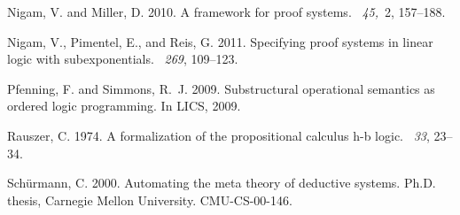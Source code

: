 \documentclass{new_tlp}
\begin{document}
\begin{thebibliography}{}
{\sc Nigam, V.} {\sc and} {\sc Miller, D.} 2010.
\newblock A framework for proof systems.
~{\em 45,\/}~2, 157--188.

{\sc Nigam, V.}, {\sc Pimentel, E.}, {\sc and} {\sc Reis, G.} 2011.
\newblock Specifying proof systems in linear logic with subexponentials.
~{\em 269}, 109--123.

{\sc Pfenning, F.} {\sc and} {\sc Simmons, R.~J.} 2009.
\newblock Substructural operational semantics as ordered logic programming.
\newblock In {LICS}, 2009.

{\sc Rauszer, C.} 1974.
\newblock A formalization of the propositional calculus h-b logic.
~{\em 33}, 23--34.

{\sc Sch{\"{u}}rmann, C.} 2000.
\newblock Automating the meta theory of deductive systems.
\newblock Ph.D. thesis, Carnegie Mellon University.
\newblock CMU-CS-00-146.

\end{thebibliography}



\label{lastpage}
\end{document}
